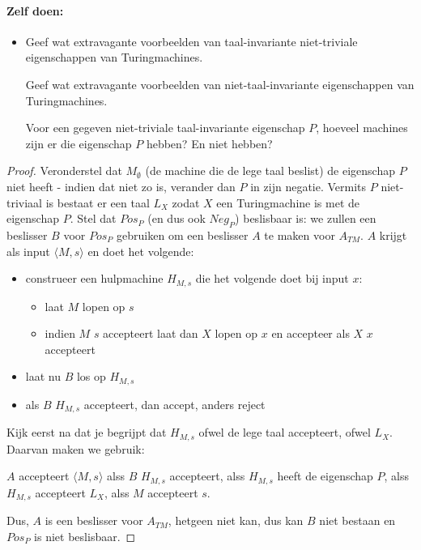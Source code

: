 \paragraph{Zelf doen:}
\begin{itemize}
\item[]
Geef wat extravagante voorbeelden van taal-invariante niet-triviale
eigenschappen van Turingmachines.

Geef wat extravagante voorbeelden van niet-taal-invariante
eigenschappen van Turingmachines.

Voor een gegeven niet-triviale taal-invariante eigenschap $P$, hoeveel
machines zijn er die eigenschap $P$ hebben? En niet hebben?
\end{itemize}


\begin{proof}
Veronderstel dat $M_\emptyset$ (de machine die de lege taal beslist)
de eigenschap $P$ niet heeft - indien dat niet zo is, verander dan $P$
in zijn negatie. Vermits $P$ niet-triviaal is bestaat er een taal $L_X$
zodat $X$ een Turingmachine is met de eigenschap $P$. Stel dat $Pos_P$
(en dus ook $Neg_P$) beslisbaar is: we zullen een beslisser $B$ voor
$Pos_P$ gebruiken om een beslisser $A$ te maken voor $A_{TM}$. $A$
krijgt als input $\langle M,s \rangle$ en doet het volgende:
\begin{itemize}
\item construeer een hulpmachine $H_{M,s}$ die het volgende doet bij
input $x$:

\begin{itemize}
\item laat $M$ lopen op $s$
\item indien $M$ $s$ accepteert laat dan $X$ lopen op $x$ en accepteer
als $X$ $x$ accepteert
\end{itemize}

\item laat nu $B$ los op $H_{M,s}$
\item als $B$ $H_{M,s}$ accepteert, dan accept, anders reject
\end{itemize}
Kijk eerst na dat je begrijpt dat $H_{M,s}$ ofwel de lege taal
accepteert, ofwel $L_X$. Daarvan maken we gebruik:


$A$ accepteert $\langle M,s \rangle$ alss $B$ $H_{M,s}$ accepteert, alss
%
$H_{M,s}$ heeft de eigenschap $P$, alss
%
$H_{M,s}$ accepteert $L_X$, alss
%
$M$ accepteert $s$.


Dus, $A$ is een beslisser voor $A_{TM}$, hetgeen niet kan, dus kan $B$
niet bestaan en $Pos_P$ is niet beslisbaar.
\end{proof} 



